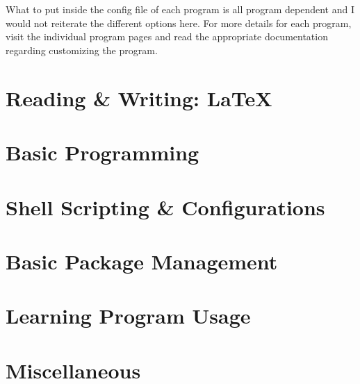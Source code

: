 \documentclass[a4paper, 12pt]{report}
\begin{document}
\begin{center}
\\~\\What to put inside the config file of each program is all program dependent and I would not reiterate the different options here. For more details for each program, visit the individual program pages and read the appropriate documentation regarding customizing the program.

\section{Reading \& Writing: \LaTeX}
\begin{comment}
\end{comment}

\section{Basic Programming}
\begin{comment}
\end{comment}

\section{Shell Scripting \& Configurations}
\begin{comment}
\end{comment}

\section{Basic Package Management}
\begin{comment}
\end{comment}

\section{Learning Program Usage}
\begin{comment}
\end{comment}

\section{Miscellaneous}
\begin{comment}
\end{comment}


\end{center}
\end{document}
